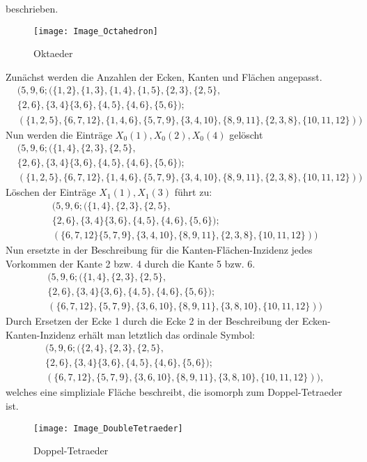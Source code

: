 \documentclass[12pt,titlepage,twoside,cleardoublepage]{article}
\theoremstyle{nummermitklammern}
\numberwithin{equation}{section}
\begin{document}
 beschrieben. 
\begin{figure}[H]
\begin{center}
\texttt{[image: Image\_Octahedron]}
\end{center}
\caption{Oktaeder}
\end{figure} 
 Zunächst werden die Anzahlen der Ecken, Kanten und Flächen angepasst.
 \begin{align*}
 &(5,9,6;(\{1,2\},\{1,3\},\{1,4\},\{1,5\},\{2,3\},\{2,5\},\\
 &\{2,6\},\{3,4\}\{3,6\},\{4,5\},\{4,6\},\{5,6\});\\
 &(\{1,2,5\},\{6,7,12\},\{1,4,6\},\{5,7,9\},\{3,4,10\},\{8,9,11\},\{2,3,8\},\{10,11,12\}))
 \end{align*}
 Nun werden die Einträge $X_0(1),X_0(2),X_0(4)$ gelöscht 
 \begin{align*}
 &(5,9,6;(\{1,4\},\{2,3\},\{2,5\},\\
 &\{2,6\},\{3,4\}\{3,6\},\{4,5\},\{4,6\},\{5,6\});\\
 &(\{1,2,5\},\{6,7,12\},\{1,4,6\},\{5,7,9\},\{3,4,10\},\{8,9,11\},\{2,3,8\},\{10,11,12\}))
 \end{align*}
 Löschen der Einträge $X_1(1),X_1(3)$ führt zu:
\begin{align*}
 &(5,9,6;(\{1,4\},\{2,3\},\{2,5\},\\
 &\{2,6\},\{3,4\}\{3,6\},\{4,5\},\{4,6\},\{5,6\});\\
 &(\{6,7,12\}\{5,7,9\},\{3,4,10\},\{8,9,11\},\{2,3,8\},\{10,11,12\}))
 \end{align*} 
 Nun ersetzte in der Beschreibung für die Kanten-Flächen-Inzidenz jedes Vorkommen der Kante 2 bzw. 4 durch die Kante 5 bzw. 6.
 \begin{align*}
 &(5,9,6;(\{1,4\},\{2,3\},\{2,5\},\\
 &\{2,6\},\{3,4\}\{3,6\},\{4,5\},\{4,6\},\{5,6\});\\
 &(\{6,7,12\},\{5,7,9\},\{3,6,10\},\{8,9,11\},\{3,8,10\},\{10,11,12\}))
 \end{align*}
 Durch Ersetzen der Ecke 1 durch die Ecke 2 in der Beschreibung der Ecken-Kanten-Inzidenz erhält man letztlich das ordinale Symbol:
 \begin{align*}
 &(5,9,6;(\{2,4\},\{2,3\},\{2,5\},\\
 &\{2,6\},\{3,4\}\{3,6\},\{4,5\},\{4,6\},\{5,6\});\\
 &(\{6,7,12\},\{5,7,9\},\{3,6,10\},\{8,9,11\},\{3,8,10\},\{10,11,12\})),
 \end{align*}
 welches eine simpliziale Fläche beschreibt, die isomorph zum Doppel-Tetraeder ist.
 \begin{figure}[H]
\begin{center}
\texttt{[image: Image\_DoubleTetraeder]}
\end{center}
\caption{Doppel-Tetraeder}
\end{figure}
\end{document}
